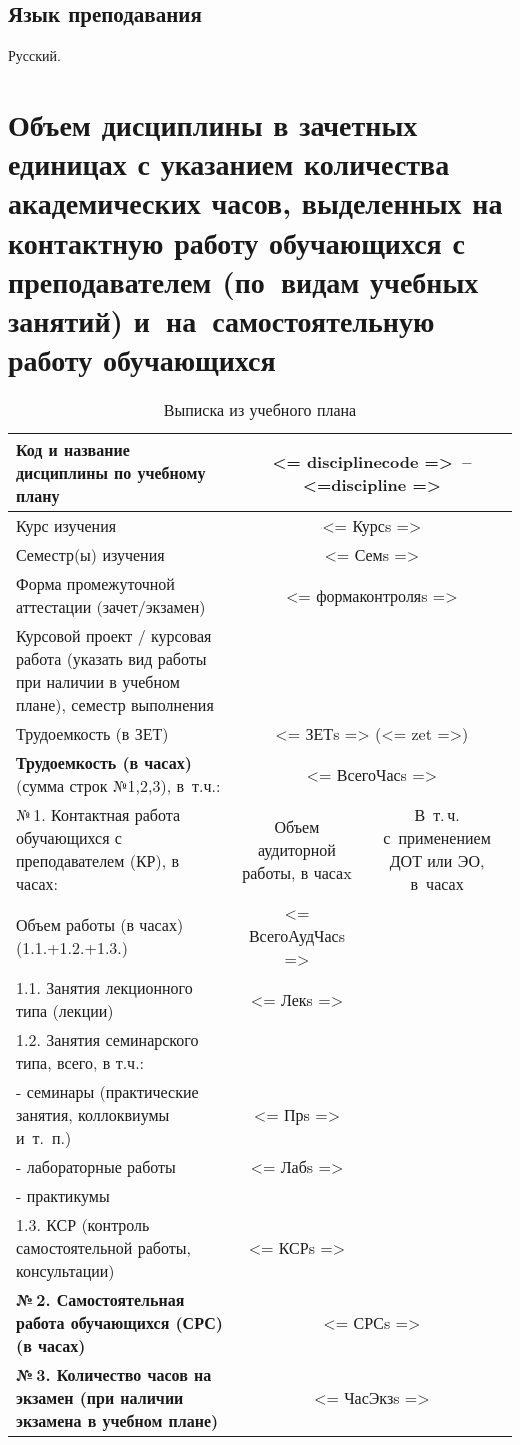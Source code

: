 \documentclass[a4paper,12pt]{article}
\begin{document}
\subsection{Язык преподавания} 

  Русский.

\newpage

\section{Объем дисциплины в зачетных единицах с указанием количества академических часов, выделенных на контактную работу обучающихся с преподавателем (по~видам учебных занятий) и~на~самостоятельную работу обучающихся}

\begin{table}[H]
\caption{Выписка из учебного плана} 
\begin{tabular}{|p{9cm}|c|c|}
\hline
Код и название дисциплины по учебному плану & \multicolumn{2}{p{6cm}|}{<= disciplinecode =>\ -- <=discipline => }\\
\hline
Курс изучения &\multicolumn{2}{c|}{ <= Курсs => }\\
\hline
Семестр(ы) изучения &\multicolumn{2}{c|}{ <= Семs => }\\
\hline
Форма промежуточной аттестации (зачет/экзамен) &\multicolumn{2}{c|}{ <= формаконтроляs => }\\
\hline
Курсовой проект / курсовая работа (указать вид работы при наличии в учебном плане), семестр выполнения &\multicolumn{2}{c|}{ }\\
\hline
Трудоемкость (в ЗЕТ) &\multicolumn{2}{c|}{ <= ЗЕТs => (<= zet =>) }\\
\hline
{\bf Трудоемкость (в часах)} (сумма строк №1,2,3), в~т.ч.:& \multicolumn{2}{c|}{<= ВсегоЧасs =>}\\
\hline
№\,1. Контактная работа обучающихся с преподавателем (КР), в часах:
& \multicolumn{1}{p{3cm}|}{\centering Объем аудиторной работы, в часаx}
& \multicolumn{1}{p{3cm}|}{\centering\arraybackslash В~т.\,ч. с~применением ДОТ или ЭО, в~часах}\\
\hline  
Объем работы (в часах) (1.1.+1.2.+1.3.)& <= ВсегоАудЧасs => & \\
\hline
1.1. Занятия лекционного типа (лекции) & <= Лекs => & \\
\hline
1.2. Занятия семинарского типа, всего, в т.ч.: & & \\
\hline
- семинары (практические занятия, коллоквиумы и~т.~п.)  & <= Прs => & \\
\hline
- лабораторные работы& <= Лабs => & \\
\hline
- практикумы & & \\
\hline
1.3. КСР (контроль самостоятельной работы, консультации)& <= КСРs => & \\
\hline
{\bf №\,2. Самостоятельная работа обучающихся (СРС) (в часах)}& \multicolumn{2}{c|}{<= СРСs =>}\\
\hline
{\bf №\,3. Количество часов на экзамен (при наличии экзамена в учебном плане)}& \multicolumn{2}{c|}{<= ЧасЭкзs =>}\\
\hline
\end{tabular}
\end{table}
\end{document}
